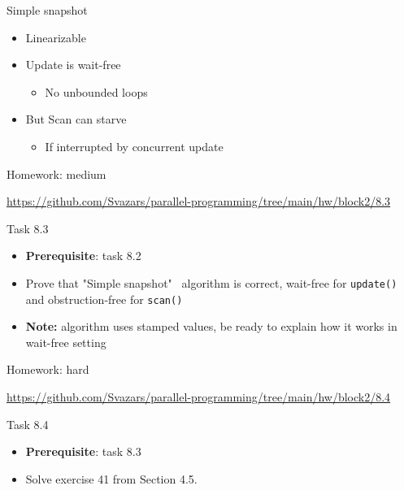 \begin{frame}[fragile]{Simple snapshot}

\begin{itemize}
  \item Linearizable
  \item Update is wait-free
  \begin{itemize}
    \item No unbounded loops
  \end{itemize}
  \item But Scan can starve 
  \begin{itemize}
    \item If interrupted by concurrent update
  \end{itemize}
\end{itemize}

\end{frame}


\begin{frame}[t, fragile]{Homework: medium}

{\small\url{https://github.com/Svazars/parallel-programming/tree/main/hw/block2/8.3}}
\begin{homeworkmail}{Task 8.3}
    \begin{itemize}
      \item \textbf{Prerequisite}: task 8.2
      \item Prove that "Simple snapshot" \ algorithm is correct, wait-free for \texttt{update()} and obstruction-free for \texttt{scan()}
      \item \textbf{Note:} algorithm uses stamped values, be ready to explain how it works in wait-free setting
    \end{itemize}
\end{homeworkmail}
\end{frame}


\begin{frame}[t, fragile]{Homework: hard}

{\small\url{https://github.com/Svazars/parallel-programming/tree/main/hw/block2/8.4}}

\begin{homeworkmail}{Task 8.4}
  \begin{itemize}
    \item \textbf{Prerequisite}: task 8.3    
    \item Solve exercise 41 from Section 4.5.
  \end{itemize}
\end{homeworkmail}
\end{frame}

